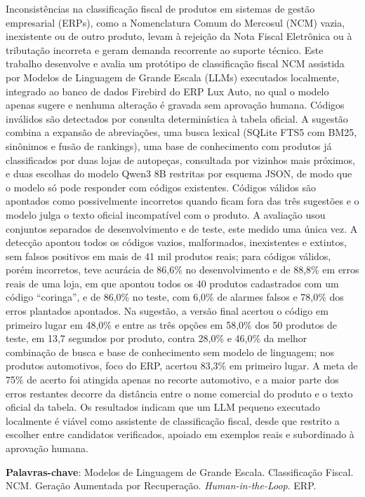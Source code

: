 \begin{resumo}
\noindent
Inconsistências na classificação fiscal de produtos em sistemas de gestão empresarial (ERPs), como a Nomenclatura Comum do Mercosul (NCM) vazia, inexistente ou de outro produto, levam à rejeição da Nota Fiscal Eletrônica ou à tributação incorreta e geram demanda recorrente ao suporte técnico. Este trabalho desenvolve e avalia um protótipo de classificação fiscal NCM assistida por Modelos de Linguagem de Grande Escala (LLMs) executados localmente, integrado ao banco de dados Firebird do ERP Lux Auto, no qual o modelo apenas sugere e nenhuma alteração é gravada sem aprovação humana. Códigos inválidos são detectados por consulta determinística à tabela oficial. A sugestão combina a expansão de abreviações, uma busca lexical (SQLite FTS5 com BM25, sinônimos e fusão de rankings), uma base de conhecimento com produtos já classificados por duas lojas de autopeças, consultada por vizinhos mais próximos, e duas escolhas do modelo Qwen3 8B restritas por esquema JSON, de modo que o modelo só pode responder com códigos existentes. Códigos válidos são apontados como possivelmente incorretos quando ficam fora das três sugestões e o modelo julga o texto oficial incompatível com o produto. A avaliação usou conjuntos separados de desenvolvimento e de teste, este medido uma única vez. A detecção apontou todos os códigos vazios, malformados, inexistentes e extintos, sem falsos positivos em mais de 41 mil produtos reais; para códigos válidos, porém incorretos, teve acurácia de 86,6\% no desenvolvimento e de 88,8\% em erros reais de uma loja, em que apontou todos os 40 produtos cadastrados com um código ``coringa'', e de 86,0\% no teste, com 6,0\% de alarmes falsos e 78,0\% dos erros plantados apontados. Na sugestão, a versão final acertou o código em primeiro lugar em 48,0\% e entre as três opções em 58,0\% dos 50 produtos de teste, em 13,7 segundos por produto, contra 28,0\% e 46,0\% da melhor combinação de busca e base de conhecimento sem modelo de linguagem; nos produtos automotivos, foco do ERP, acertou 83,3\% em primeiro lugar. A meta de 75\% de acerto foi atingida apenas no recorte automotivo, e a maior parte dos erros restantes decorre da distância entre o nome comercial do produto e o texto oficial da tabela. Os resultados indicam que um LLM pequeno executado localmente é viável como assistente de classificação fiscal, desde que restrito a escolher entre candidatos verificados, apoiado em exemplos reais e subordinado à aprovação humana.

\vspace{\onelineskip}
\noindent
\textbf{Palavras-chave}: Modelos de Linguagem de Grande Escala. Classificação Fiscal. NCM. Geração Aumentada por Recuperação. \textit{Human-in-the-Loop}. ERP.
\end{resumo}

